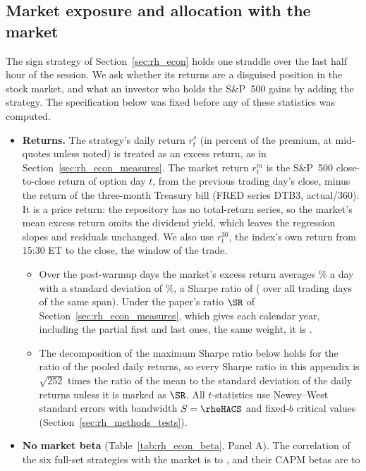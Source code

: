 \subsection{Market exposure and allocation with the market}
\label{app:rh_econ_beta}
The sign strategy of Section~\ref{sec:rh_econ} holds one straddle over the last half hour of the session. We ask
whether its returns are a disguised position in the stock market, and what an investor who holds the S\&P~500 gains
by adding the strategy. The specification below was fixed before any of these statistics was computed.
\begin{itemize}
\item \textbf{Returns.} The strategy's daily return $r^{s}_t$ (in percent of the premium, at mid-quotes unless noted)
  is treated as an excess return, as in Section~\ref{sec:rh_econ_measures}. The market return $r^{m}_t$ is the
  S\&P~500 close-to-close return of option day $t$, from the previous trading day's close, minus the return of the
  three-month Treasury bill (FRED series DTB3, actual/360). It is a price return: the repository has no total-return
  series, so the market's mean excess return omits the dividend yield, which leaves the regression slopes and
  residuals unchanged. We also use $r^{30}_t$, the index's own return from 15:30 ET to the close, the window of the
  trade.
  \begin{itemize}
  \item Over the \rhebNDays{} post-warmup days the market's excess return averages \rhebMktMean\% a day with a
    standard deviation of \rhebMktSd\%, a Sharpe ratio of \rhebSRm{} (\rhebSRmAll{} over all \rhebNAll{} trading days
    of the same span). Under the paper's ratio $\SR$ of Section~\ref{sec:rh_econ_measures}, which gives each calendar
    year, including the partial first and last ones, the same weight, it is \rhebSRmDSix.
  \item The decomposition of the maximum Sharpe ratio below holds for the ratio of the pooled daily returns, so every
    Sharpe ratio in this appendix is $\sqrt{252}$ times the ratio of the mean to the standard deviation of the daily
    returns unless it is marked as $\SR$. All $t$-statistics use Newey--West standard errors with bandwidth
    $S = \rheHACS$ and fixed-$b$ critical values (Section~\ref{sec:rh_methods_tests}).
  \end{itemize}
\item \textbf{No market beta} (Table~\ref{tab:rh_econ_beta}, Panel A). The correlation of the six full-set strategies
  with the market is \rhebCorrFullMin{} to \rhebCorrFullMax, and their CAPM betas are \rhebBetaFullMin{} to

\end{itemize}

